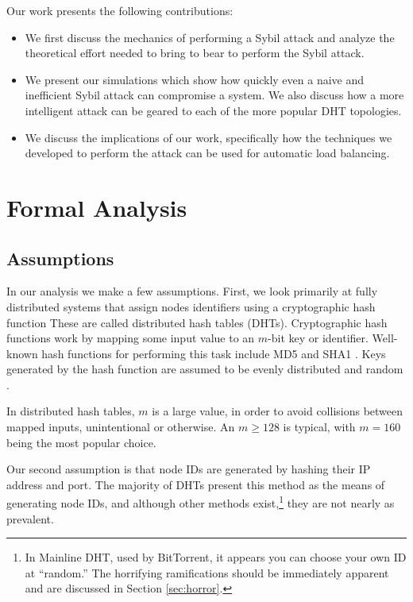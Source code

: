 \documentclass[a4paper]{article}
\begin{document}
Our work presents the following contributions:
\begin{itemize}
    \item We first discuss the mechanics of performing a Sybil attack and analyze the theoretical effort needed to bring to bear to perform the Sybil attack.
    \item We present our simulations which show how quickly even a naive and inefficient Sybil attack can compromise a system.  We also discuss how a more intelligent attack can be geared to each of the more popular DHT topologies.
    \item We discuss the implications of our work, specifically how the techniques we developed to perform the attack can be used for automatic load balancing.

\end{itemize}

\section{Formal Analysis}




\subsection{Assumptions}
In our analysis we make a few assumptions. 
First, we look primarily at fully distributed systems that assign nodes identifiers using a cryptographic hash function
These are called distributed hash tables (DHTs).
Cryptographic hash functions work by mapping some input value to an $m$-bit key or identifier.
Well-known hash functions for performing this task include MD5 \cite{md5} and SHA1 \cite{sha1}.
Keys generated by the hash function are assumed to be evenly distributed and random \cite{bellare2004hash}. 

In distributed hash tables, $m$ is a large value, in order to avoid collisions between mapped inputs, unintentional or otherwise. 
An $m \geq 128$ is typical, with $m = 160$ being the most popular choice.


Our second assumption is that node IDs are generated by hashing their IP address and port.
The majority of DHTs present this method as the means of generating node IDs, and although other methods exist,\footnote{In Mainline DHT, used by BitTorrent, it appears you can choose your own ID at ``random.''  The horrifying ramifications should be immediately apparent and are discussed in Section \ref{sec:horror}.} they are not nearly as prevalent.
\end{document}
